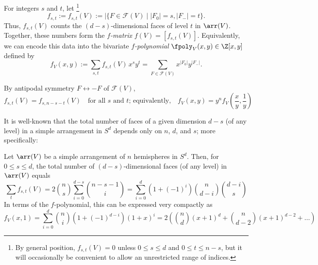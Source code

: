%
%
\begin{definition}
\label{def:f-poly}
For integers $s$ and $t$, let%
\footnote{By general position, $f_{s,t}(V)=0$ unless $0\leq s\leq d$ and $0\leq t\leq n-s$, but it will occasionally be convenient to allow an unrestricted range of indices.}
$$
f_{s,t} := f_{s,t}(V):=|\{F\in \mathcal{F}(V)\mid |F_0|=s,|F_-|=t\}.
$$
Thus, $f_{s,t}(V)$ counts the $(d-s)$-dimensional faces of level $t$ in $\arr(V)$. 
%
Together, these numbers form the \emph{$f$-matrix} $f(V)=[f_{s,t}(V)]$. Equivalently, we can encode this data into the bivariate \emph{$f$-polynomial} $\fpoly_V(x,y) \in  \Z[x,y]$ defined by 
$$
f_{V}(x,y) := \sum_{s,t} f_{s,t}(V)\, x^s y^t =\sum_{F\in \mathcal{F}(V)} x^{|F_0|} y^{|F_-|}.
$$
\end{definition}
\begin{observation} 
\label{obs:f-antipodal-symm} By antipodal symmetry $F\leftrightarrow -F$ of $\mathcal{F}(V)$, 
\begin{equation}
\label{eq:f-symm}
f_{s,t}(V)=f_{s,n-s-t}(V) \quad \textrm{for all $s$ and $t$; equivalently,} \textstyle \quad f_V(x,y)= y^n f_V(\frac{x}{y},\frac{1}{y})
\end{equation}
\end{observation}
It is well-known \cite[Sec.~18.1]{Grunbaum:2003aa} that the total number of faces of a given dimension $d-s$ (of any level) in a simple arrangement in $S^d$ depends only on $n$, $d$, and $s$; more specifically:
\begin{lemma}
Let $\arr(V)$ be a simple arrangement of $n$ hemispheres in $S^d$. Then, for $0\leq s\leq d$,
the total number of $(d-s)$-dimensional faces (of any level) in $\arr(V)$ equals
\begin{equation}
\label{eq:total-number-faces}
\sum_t f_{s,t}(V) = 2\binom{n}{s}\sum_{i=0}^{d-s} \binom{n-s-1}{i} = \sum_{i=0}^d (1+(-1)^i)\binom{n}{d-i} \binom{d-i}{s}
\end{equation}
In terms of the $f$-polynomial, this can be expressed very compactly as
\begin{equation}
\label{eq:f-tutte}
\textstyle f_V(x,1) = \sum_{i=0}^d \binom{n}{i}\left(1+(-1)^{d-i}\right)(1+x)^i = 2\left(\binom{n}{d}(x+1)^d + \binom{n}{d-2}(x+1)^{d-2} + \dots\right)
\end{equation}
\end{lemma}
